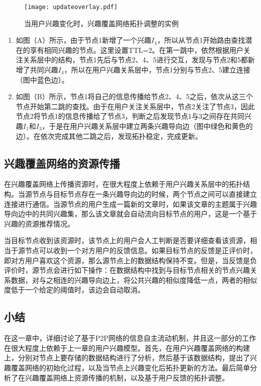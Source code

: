 \begin{figure}[!ht]
\centering
\texttt{[image: updateoverlay.pdf]}
\caption{当用户兴趣变化时，兴趣覆盖网络拓扑调整的实例}
\label{fig:updateoverlay}
\end{figure}

\begin{enumerate}
  \item 如图（A）所示，由于节点1新增了一个兴趣$I_4$，所以从节点1开始路由查找潜在的享有相同兴趣的节点。这里设置TTL=2。在第一跳中，依然根据用户关注关系层中的结构，节点1先后与节点2、4、5进行交互，发现与节点2和5都新增了共同兴趣$I_4$，所以在用户兴趣关系层中，节点1分别与节点2、5建立连接（图中蓝色边）。
  \item 如图（B）所示，节点1将自己的信息传播给节点2、4、5之后，依次从这三个节点开始第二跳的查找。由于在用户关注关系层中，节点2关注了节点3，因此节点2将节点1的信息传播给了节点3，判断之后发现节点1与3之间存在共同兴趣$I_1$和$I_3$，于是在用户兴趣关系层中建立两条兴趣导向边（图中绿色和黄色的边）。在依次完成其他二跳之后，发现拓扑稳定，完成更新。
\end{enumerate}

\subsection{兴趣覆盖网络的资源传播}
在兴趣覆盖网络上传播资源时，在很大程度上依赖于用户兴趣关系层中的拓扑结构。当源节点与目标节点存在一条兴趣导向边的时候，两个节点之间可以直接建立连接进行通信。当源节点的用户生成一篇新的文章时，如果该文章的主题属于兴趣导向边中的共同兴趣集，那么该文章就会自动流向目标节点的用户，这是一个基于兴趣的资源推荐情况。

当目标节点收到该资源时，该节点上的用户会人工判断是否要详细查看该资源，相当于源节点可以收到一个对方用户的反馈信息。如果目标节点的反馈是正评价时，即对方用户喜欢这个资源，那么源节点上的数据结构保持不变。但是，当反馈是负评价时，源节点会进行如下操作：在数据结构中找到与目标节点相关的节点兴趣关系数据，对与之相连的兴趣导向边上，将公共兴趣的相似度降低一点，两者的相似度低于一个给定的阈值时，该边会自动取消。

\subsection{小结}
在这一章中，详细讨论了基于P2P网络的信息自主流动机制，并且这一部分的工作在很大程度上依赖于上一章的用户兴趣模型。首先，在用户兴趣覆盖网络的构建上，分别对节点上要存储的数据结构进行了分析，然后基于该数据结构，提出了兴趣覆盖网络的初始化过程，以及当节点上兴趣变化后拓扑更新的方法。最后简单分析了在兴趣覆盖网络上资源传播的机制，以及基于用户反馈的拓扑调整。
